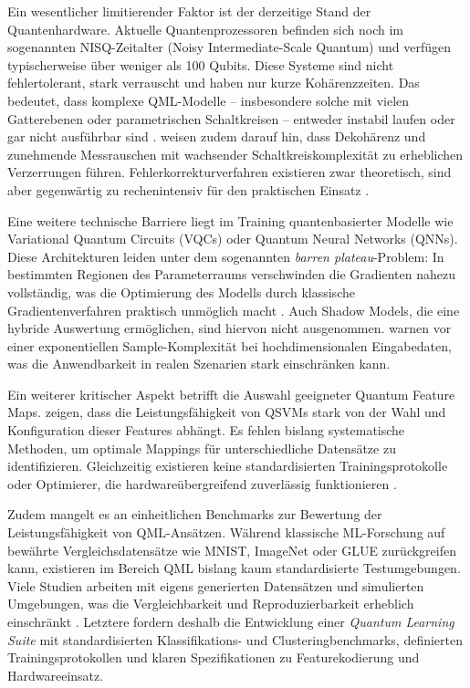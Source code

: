 Ein wesentlicher limitierender Faktor ist der derzeitige Stand der Quantenhardware. Aktuelle Quantenprozessoren befinden sich noch im sogenannten NISQ-Zeitalter (Noisy Intermediate-Scale Quantum) und verfügen typischerweise über weniger als 100 Qubits. Diese Systeme sind nicht fehlertolerant, stark verrauscht und haben nur kurze Kohärenzzeiten. Das bedeutet, dass komplexe QML-Modelle – insbesondere solche mit vielen Gatterebenen oder parametrischen Schaltkreisen – entweder instabil laufen oder gar nicht ausführbar sind \cite[S.~13]{uddin2024, gujju2024, peralgarcia2024}. \cite[S.~10--11]{tychola2023} weisen zudem darauf hin, dass Dekohärenz und zunehmende Messrauschen mit wachsender Schaltkreiskomplexität zu erheblichen Verzerrungen führen. Fehlerkorrekturverfahren existieren zwar theoretisch, sind aber gegenwärtig zu rechenintensiv für den praktischen Einsatz \cite[S.~10]{tychola2023}.

Eine weitere technische Barriere liegt im Training quantenbasierter Modelle wie Variational Quantum Circuits (VQCs) oder Quantum Neural Networks (QNNs). Diese Architekturen leiden unter dem sogenannten \textit{barren plateau}-Problem: In bestimmten Regionen des Parameterraums verschwinden die Gradienten nahezu vollständig, was die Optimierung des Modells durch klassische Gradientenverfahren praktisch unmöglich macht \cite{liu2024, tychola2023}. Auch Shadow Models, die eine hybride Auswertung ermöglichen, sind hiervon nicht ausgenommen. \cite[S.~4]{jerbi2024} warnen vor einer exponentiellen Sample-Komplexität bei hochdimensionalen Eingabedaten, was die Anwendbarkeit in realen Szenarien stark einschränken kann.

Ein weiterer kritischer Aspekt betrifft die Auswahl geeigneter Quantum Feature Maps. \cite{kavitha2024} zeigen, dass die Leistungsfähigkeit von QSVMs stark von der Wahl und Konfiguration dieser Features abhängt. Es fehlen bislang systematische Methoden, um optimale Mappings für unterschiedliche Datensätze zu identifizieren. Gleichzeitig existieren keine standardisierten Trainingsprotokolle oder Optimierer, die hardwareübergreifend zuverlässig funktionieren \cite[S.~14]{uddin2024}.

Zudem mangelt es an einheitlichen Benchmarks zur Bewertung der Leistungsfähigkeit von QML-Ansätzen. Während klassische ML-Forschung auf bewährte Vergleichsdatensätze wie MNIST, ImageNet oder GLUE zurückgreifen kann, existieren im Bereich QML bislang kaum standardisierte Testumgebungen. Viele Studien arbeiten mit eigens generierten Datensätzen und simulierten Umgebungen, was die Vergleichbarkeit und Reproduzierbarkeit erheblich einschränkt \cite[S.~14--15]{uddin2024, gujju2024}. Letztere fordern deshalb die Entwicklung einer \textit{Quantum Learning Suite} mit standardisierten Klassifikations- und Clusteringbenchmarks, definierten Trainingsprotokollen und klaren Spezifikationen zu Featurekodierung und Hardwareeinsatz.

